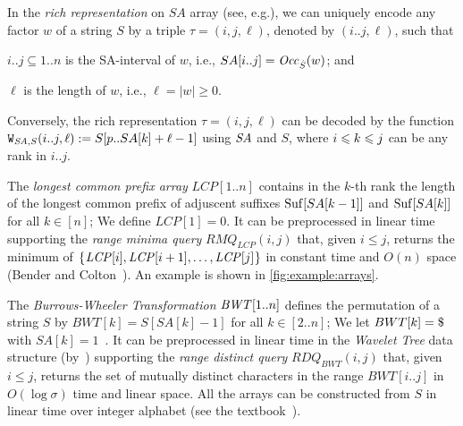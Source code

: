 In the \textit{rich representation} on $SA$ array (see, e.g.\cite{kasai:lee2001lcp:linear,abouelhoda2004replacing}), we can uniquely encode any factor $w$ of a string $S$ by a triple $\tau = (i, j, \ell)$, denoted by $(i..j, \ell)$, such that
\begin{enumerate*}[(i)]
\item $i..j \subseteq 1..n$ is the SA-interval of $w$, i.e., $SA[i..j] = \Occ(w)$; and  
\item $\ell$ is the length of $w$, i.e., $\ell = |w|\ge 0$. 
\end{enumerate*}
Conversely, the rich representation $\tau = (i, j, \ell)$ can be decoded by the function $\getfactor(i..j, \ell) := S[p..SA[k]+\ell-1]$ using $\SA$ and $S$, where $\btw kij$ can be any rank in $i..j$. 

The \textit{longest common prefix array} $LCP[1..n]$ contains in the $k$-th rank the length of the longest common prefix of adjuscent suffixes $\Suf[SA[k-1]]$ and $\Suf[SA[k]]$ for all $k \in [n]$; We define $LCP[1] = 0$. It can be preprocessed in linear time supporting the \textit{range minima query} $RMQ_{LCP}(i, j)$ that, given $i\le j$, returns the minimum of $\set{\LCP[i], \LCP[i+1], \dots, \LCP[j]}$ in constant time and $O(n)$ space (Bender and Colton~\cite{bender:colton2000thelcaproblem}).
An example is shown in \cref{fig:example:arrays}. 

The \textit{Burrows-Wheeler Transformation} $\BWT[1..n]$ defines the permutation of a string $S$ by $BWT[k] = S[SA[k]-1]$ for all $k \in [2..n]$; We let $BWT[k] = \daller$ with $SA[k] = 1$~\cite{burrows:wheeler1994blocksorting}. 
It can be preprocessed in linear time in the \textit{Wavelet Tree} data structure (by~\cite{grossi2003high}) supporting the \textit{range distinct query} $RDQ_{BWT}(i, j)$ that, given $i\le j$, returns the set of mutually distinct characters in the range $BWT[i..j]$ in $O(\log\sigma)$ time and
linear space. 
All the arrays can be constructed from $S$ in linear time over integer alphabet (see the textbook~\cite{navarro2016cds:book}). 


